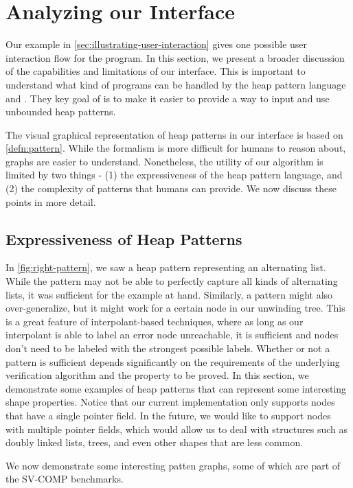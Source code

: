 \section{Analyzing our Interface}
Our example in \autoref{sec:illustrating-user-interaction} gives one possible user interaction flow for the \altlistsimplified program. In this section, we present a broader discussion of the capabilities and limitations of our interface. This is important to understand what kind of programs can be handled by the heap pattern language and \verifier. They key goal of \verifier is to make it easier to provide a way to input and use unbounded heap patterns.

The visual graphical representation of heap patterns in our interface is based on \autoref{defn:pattern}. While the formalism is more difficult for humans to reason about, graphs are easier to understand. Nonetheless, the utility of our algorithm is limited by two things - (1) the expressiveness of the heap pattern language, and (2) the complexity of patterns that humans can provide. We now discuss these points in more detail.

\subsection{Expressiveness of Heap Patterns}
\label{sec:expressiveness-of-heap-patterns}
In \autoref{fig:right-pattern}, we saw a heap pattern representing an alternating list. While the pattern may not be able to perfectly capture all kinds of alternating lists, it was sufficient for the example at hand. Similarly, a pattern might also over-generalize, but it might work for a certain node in our unwinding tree. This is a great feature of interpolant-based techniques, where as long as our interpolant is able to label an error node unreachable, it is sufficient and nodes don't need to be labeled with the strongest possible labels. Whether or not a pattern is sufficient depends significantly on the requirements of the underlying verification algorithm and the property to be proved. In this section, we demonstrate some examples of heap patterns that can represent some interesting shape properties. Notice that our current implementation only supports nodes that have a single pointer field. In the future, we would like to support nodes with multiple pointer fields, which would allow us to deal with structures such as doubly linked lists, trees, and even other shapes that are less common.

We now demonstrate some interesting patten graphs, some of which are part of the SV-COMP \cite{sv-comp} benchmarks.


